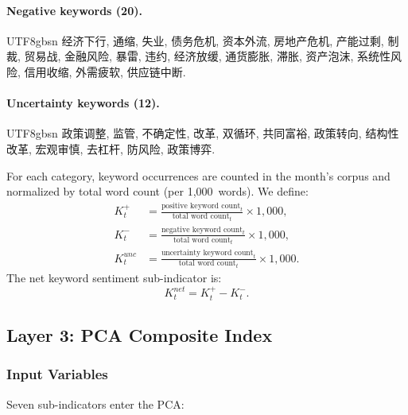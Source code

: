 \documentclass[11pt]{article}
\begin{document}
\paragraph{Negative keywords (20).}
\begin{CJK}{UTF8}{gbsn}
经济下行, 通缩, 失业, 债务危机, 资本外流, 房地产危机, 产能过剩,
制裁, 贸易战, 金融风险, 暴雷, 违约, 经济放缓, 通货膨胀, 滞胀,
资产泡沫, 系统性风险, 信用收缩, 外需疲软, 供应链中断.
\end{CJK}

\paragraph{Uncertainty keywords (12).}
\begin{CJK}{UTF8}{gbsn}
政策调整, 监管, 不确定性, 改革, 双循环, 共同富裕, 政策转向,
结构性改革, 宏观审慎, 去杠杆, 防风险, 政策博弈.
\end{CJK}

\medskip
For each category, keyword occurrences are counted in the month's
corpus and normalized by total word count (per 1{,}000~words).  We
define:
\begin{align}
  K_t^{+}   &= \frac{\text{positive keyword count}_t}
                      {\text{total word count}_t} \times 1{,}000,
                      \label{eq:kpos} \\
  K_t^{-}   &= \frac{\text{negative keyword count}_t}
                      {\text{total word count}_t} \times 1{,}000,
                      \label{eq:kneg} \\
  K_t^{unc} &= \frac{\text{uncertainty keyword count}_t}
                      {\text{total word count}_t} \times 1{,}000.
                      \label{eq:kunc}
\end{align}
The net keyword sentiment sub-indicator is:
\begin{equation}\label{eq:knet}
  K_t^{net} = K_t^{+} - K_t^{-}.
\end{equation}

\subsection{Layer 3: PCA Composite Index}\label{sec:method:pca}

\subsubsection{Input Variables}

Seven sub-indicators enter the PCA:
\end{document}
